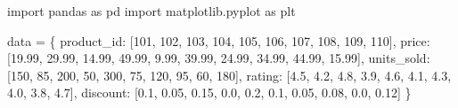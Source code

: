 \documentclass[
  english,
  letterpaper,
  DIV=11,
  numbers=noendperiod]{scrreprt}
\newenvironment{Shaded}{\begin{snugshade}}{\end{snugshade}}
\newcommand{\DecValTok}[1]{\textcolor[rgb]{0.68,0.00,0.00}{#1}}
\newcommand{\FloatTok}[1]{\textcolor[rgb]{0.68,0.00,0.00}{#1}}
\newcommand{\ImportTok}[1]{\textcolor[rgb]{0.00,0.46,0.62}{#1}}
\newcommand{\NormalTok}[1]{\textcolor[rgb]{0.00,0.23,0.31}{#1}}
\newcommand{\OperatorTok}[1]{\textcolor[rgb]{0.37,0.37,0.37}{#1}}
\newcommand{\StringTok}[1]{\textcolor[rgb]{0.13,0.47,0.30}{#1}}
\newcommand*\circled[1]{\tikz[baseline=(char.base)]{
          \node[shape=circle,draw,inner sep=1pt] (char) {{\scriptsize#1}};}}
\begin{document}
\protect{}\label{annotated-cell-183}%
\begin{Shaded}
\begin{Highlighting}[]
\ImportTok{import}\NormalTok{ pandas }\ImportTok{as}\NormalTok{ pd}
\ImportTok{import}\NormalTok{ matplotlib.pyplot }\ImportTok{as}\NormalTok{ plt}


\NormalTok{data }\OperatorTok{=}\NormalTok{ \{ }\hspace*{\fill}\NormalTok{\circled{1}}
    \StringTok{\textquotesingle{}product\_id\textquotesingle{}}\NormalTok{: [}\DecValTok{101}\NormalTok{, }\DecValTok{102}\NormalTok{, }\DecValTok{103}\NormalTok{, }\DecValTok{104}\NormalTok{, }\DecValTok{105}\NormalTok{, }\DecValTok{106}\NormalTok{, }\DecValTok{107}\NormalTok{, }\DecValTok{108}\NormalTok{, }\DecValTok{109}\NormalTok{, }\DecValTok{110}\NormalTok{],}
    \StringTok{\textquotesingle{}price\textquotesingle{}}\NormalTok{: [}\FloatTok{19.99}\NormalTok{, }\FloatTok{29.99}\NormalTok{, }\FloatTok{14.99}\NormalTok{, }\FloatTok{49.99}\NormalTok{, }\FloatTok{9.99}\NormalTok{, }\FloatTok{39.99}\NormalTok{, }\FloatTok{24.99}\NormalTok{, }\FloatTok{34.99}\NormalTok{, }\FloatTok{44.99}\NormalTok{, }\FloatTok{15.99}\NormalTok{],}
    \StringTok{\textquotesingle{}units\_sold\textquotesingle{}}\NormalTok{: [}\DecValTok{150}\NormalTok{, }\DecValTok{85}\NormalTok{, }\DecValTok{200}\NormalTok{, }\DecValTok{50}\NormalTok{, }\DecValTok{300}\NormalTok{, }\DecValTok{75}\NormalTok{, }\DecValTok{120}\NormalTok{, }\DecValTok{95}\NormalTok{, }\DecValTok{60}\NormalTok{, }\DecValTok{180}\NormalTok{],}
    \StringTok{\textquotesingle{}rating\textquotesingle{}}\NormalTok{: [}\FloatTok{4.5}\NormalTok{, }\FloatTok{4.2}\NormalTok{, }\FloatTok{4.8}\NormalTok{, }\FloatTok{3.9}\NormalTok{, }\FloatTok{4.6}\NormalTok{, }\FloatTok{4.1}\NormalTok{, }\FloatTok{4.3}\NormalTok{, }\FloatTok{4.0}\NormalTok{, }\FloatTok{3.8}\NormalTok{, }\FloatTok{4.7}\NormalTok{],}
    \StringTok{\textquotesingle{}discount\textquotesingle{}}\NormalTok{: [}\FloatTok{0.1}\NormalTok{, }\FloatTok{0.05}\NormalTok{, }\FloatTok{0.15}\NormalTok{, }\FloatTok{0.0}\NormalTok{, }\FloatTok{0.2}\NormalTok{, }\FloatTok{0.1}\NormalTok{, }\FloatTok{0.05}\NormalTok{, }\FloatTok{0.08}\NormalTok{, }\FloatTok{0.0}\NormalTok{, }\FloatTok{0.12}\NormalTok{]}
\NormalTok{\}}


\end{Highlighting}
\end{Shaded}
\end{document}
